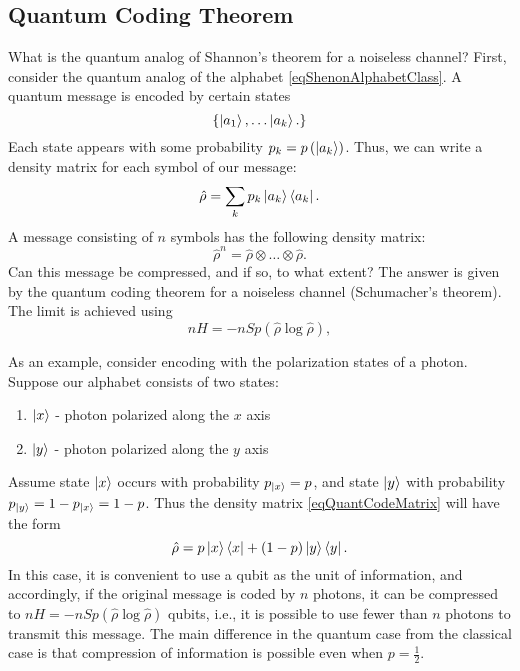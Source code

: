 \subsection{Quantum Coding Theorem}
What is the quantum analog of Shannon's theorem for a noiseless channel? First, consider the quantum analog of the alphabet \eqref{eqShenonAlphabetClass}. A quantum message is encoded by certain states
\begin{equation}
\left\{
\ket{a_1}, \dotsc \ket{a_k}.
\right\}
\label{eqSchumacherAlphabet}
\end{equation}
Each state appears with some probability $p_k = p\left(\ket{a_k}\right)$. Thus, we can write a density matrix for each symbol of our message:
\begin{equation}
\hat{\rho} = \sum_k p_k \ket{a_k}\bra{a_k}.
\label{eqQuantCodeMatrix}
\end{equation}
A message consisting of $n$ symbols has the following density matrix:
\begin{equation}
\hat{\rho}^n = \hat{\rho}\otimes \dots \otimes \hat{\rho}.
\nonumber
\end{equation}
Can this message be compressed, and if so, to what extent? The answer is given by the quantum coding theorem for a noiseless channel (Schumacher's theorem). The limit is achieved using
\begin{equation}
n H = - n Sp \left(\hat{\rho} \log \hat{\rho} \right),
\nonumber
\end{equation}

As an example, consider encoding with the polarization states of a photon. Suppose our alphabet consists of two states:
\begin{enumerate}
\item $\ket{x}$ - photon polarized along the $x$ axis
\item $\ket{y}$ - photon polarized along the $y$ axis
\end{enumerate}
Assume state $\ket{x}$ occurs with probability $p_{\ket{x}} = p$, and state $\ket{y}$ with probability $p_{\ket{y}} = 1 - p_{\ket{x}} = 1 - p$.
Thus the density matrix 
\eqref{eqQuantCodeMatrix} will have the form
\begin{equation}
\hat{\rho} = p \ket{x}\bra{x} + \left(1 - p\right) \ket{y}\bra{y}.
\label{eqQuantCodeMatrixQBIT}
\end{equation}
In this case, it is convenient to use a qubit as the unit of information, and accordingly, if the original message is coded by $n$ photons, it can be compressed to
\(
n H = - n Sp \left(\hat{\rho} \log \hat{\rho} \right)
\)
qubits, i.e., it is possible to use fewer than $n$ photons  to transmit this message. The main difference in the quantum case from the classical case is that compression of information is possible even when $p = \frac{1}{2}$.